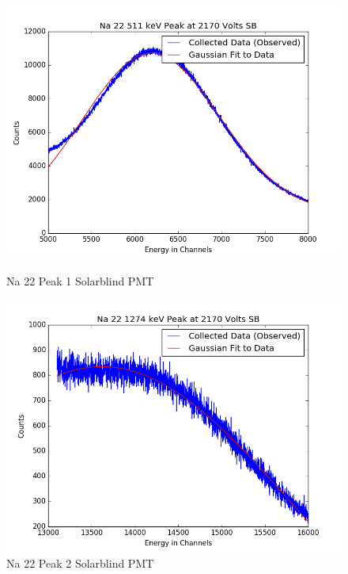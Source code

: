 \documentclass{article}
\begin{document}
\begin{figure}[H]
  \centering
  \begin{minipage}[b]{0.4\textwidth}
    \includegraphics[width=\textwidth]{SBNa1fit.png}
    \caption{Na 22 Peak 1 Solarblind PMT}
  \end{minipage}
  \hfill
  \begin{minipage}[b]{0.4\textwidth}
    \includegraphics[width=\textwidth]{SBNa2fit.png}
    \caption{Na 22 Peak 2 Solarblind PMT}
  \end{minipage}
\end{figure}
\end{document}
